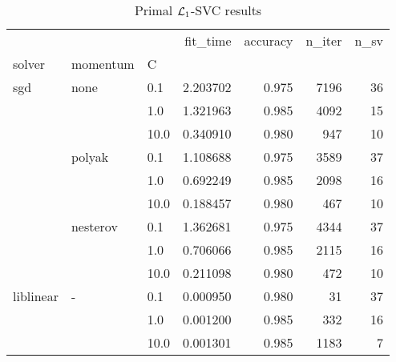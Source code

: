 \begin{table}[H]
\centering
\caption{Primal $\protect \mathcal{L}_1$-SVC results}
\label{primal_l1_svc_cv_results}
\begin{tabular}{lllrrrr}
\toprule
          &   &      &  fit\_time &  accuracy &  n\_iter &  n\_sv \\
solver & momentum & C &           &           &         &       \\
\midrule
sgd & none & 0.1  &  2.203702 &     0.975 &    7196 &    36 \\
          &   & 1.0  &  1.321963 &     0.985 &    4092 &    15 \\
          &   & 10.0 &  0.340910 &     0.980 &     947 &    10 \\
          & polyak & 0.1  &  1.108688 &     0.975 &    3589 &    37 \\
          &   & 1.0  &  0.692249 &     0.985 &    2098 &    16 \\
          &   & 10.0 &  0.188457 &     0.980 &     467 &    10 \\
          & nesterov & 0.1  &  1.362681 &     0.975 &    4344 &    37 \\
          &   & 1.0  &  0.706066 &     0.985 &    2115 &    16 \\
          &   & 10.0 &  0.211098 &     0.980 &     472 &    10 \\
liblinear & - & 0.1  &  0.000950 &     0.980 &      31 &    37 \\
          &   & 1.0  &  0.001200 &     0.985 &     332 &    16 \\
          &   & 10.0 &  0.001301 &     0.985 &    1183 &     7 \\
\bottomrule
\end{tabular}
\end{table}
